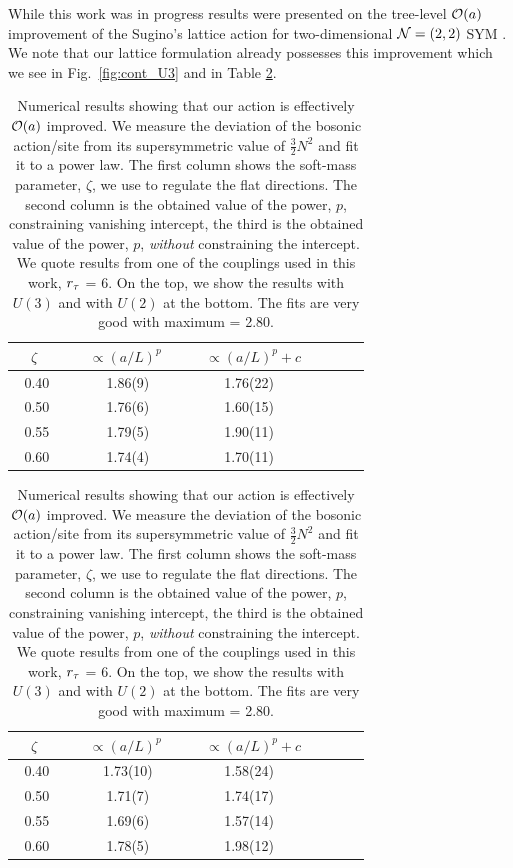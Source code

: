 While this work was in progress results were presented on the tree-level $\mathcal O(a)$ improvement of the Sugino's lattice action for two-dimensional $\mathcal N = (2, 2)$ SYM \cite{Hanada:2017gqc}.
We note that our lattice formulation already possesses this improvement which we see in Fig.~\ref{fig:cont_U3} and in
Table \ref{table:order_a}.



\begin{table}[htbp]
   \vspace{10mm}
      \centering
 \begin{tabular}{cccccc}
\hline \hline
\ \ $\zeta$ \ \ & \ \ $\propto (a/L)^{p} $ \ \ & \ $\propto (a/L)^{p} + c $ \\
\hline
0.40 & 1.86(9) & 1.76(22) & \ \ \\
0.50 & 1.76(6) & 1.60(15) & \ \ \\
0.55 & 1.79(5) & 1.90(11) &  \ \ \\
0.60 & 1.74(4) & 1.70(11) &   \ \ \\
\hline
  
  
  
\end{tabular}
      \centering
 \begin{tabular}{cccccc}

\hline \hline
\ \ $\zeta$ \ \ & \ \ $\propto (a/L)^{p} $ \ \ & \ $\propto (a/L)^{p} + c $ \\
\hline
0.40 & 1.73(10) & 1.58(24) & \ \ \\
0.50 & 1.71(7) & 1.74(17) & \\
0.55 & 1.69(6) & 1.57(14) &  \ \ \\
0.60 & 1.78(5) & 1.98(12) &   \ \ \\
\hline
\end{tabular}

\caption{\label{table:order_a}Numerical results showing that our action is effectively $\mathcal O(a)$ improved. We measure the deviation of the bosonic action/site from its supersymmetric value of $\frac{3}{2}N^2$ and fit it to a power law. The first column shows the soft-mass parameter, $\zeta$, we use to regulate the flat directions. The second column is the obtained value of the power, $p$, constraining vanishing intercept, the third is the obtained value of the power, $p$, \emph{without} constraining the intercept. We quote results from one of the couplings used in this work, ${r_{\tau}}$ = 6. On the top, we show the results with $U(3)$ and with $U(2)$ at the bottom. The fits are very good with maximum \CHI = 2.80.}
\end{table}

